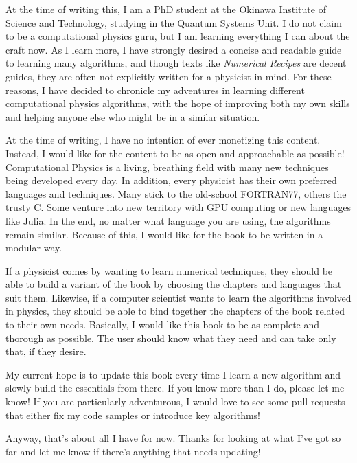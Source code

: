 At the time of writing this, I am a PhD student at the Okinawa Institute of Science and Technology, studying in the Quantum Systems Unit.
I do not claim to be a computational physics guru, but I am learning everything I can about the craft now.
As I learn more, I have strongly desired a concise and readable guide to learning many algorithms, and though texts like \textit{Numerical Recipes} are decent guides, they are often not explicitly written for a physicist in mind.
For these reasons, I have decided to chronicle my adventures in learning different computational physics algorithms, with the hope of improving both my own skills and helping anyone else who might be in a similar situation.

At the time of writing, I have no intention of ever monetizing this content. 
Instead, I would like for the content to be as open and approachable as possible!
Computational Physics is a living, breathing field with many new techniques being developed every day. 
In addition, every physicist has their own preferred languages and techniques.
Many stick to the old-school FORTRAN77, others the trusty C. 
Some venture into new territory with GPU computing or new languages like Julia.
In the end, no matter what language you are using, the algorithms remain similar.
Because of this, I would like for the book to be written in a modular way. 

If a physicist comes by wanting to learn numerical techniques, they should be able to build a variant of the book by choosing the chapters and languages that suit them. 
Likewise, if a computer scientist wants to learn the algorithms involved in physics, they should be able to bind together the chapters of the book related to their own needs. 
Basically, I would like this book to be as complete and thorough as possible. 
The user should know what they need and can take only that, if they desire. 

My current hope is to update this book every time I learn a new algorithm and slowly build the essentials from there.
If you know more than I do, please let me know! 
If you are particularly adventurous, I would love to see some pull requests that either fix my code samples or introduce key algorithms!

Anyway, that's about all I have for now. 
Thanks for looking at what I've got so far and let me know if there's anything that needs updating!
